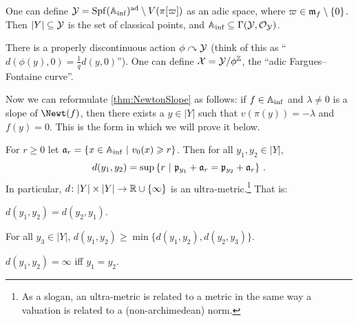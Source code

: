 \begin{rem}\label{rem:Y}
	\begin{numerate}
		\item One can define $\mathcal{Y}=\operatorname{Spf}(\mathbb{A}_{\mathrm{inf}})^\mathrm{ad}\setminus V(\pi[\varpi])$ as an adic space, where $\varpi\in\mathfrak{m}_f\setminus\{0\}$. Then $|Y|\subseteq \mathcal{Y}$ is the set of classical points, and $\mathbb{A}_{\mathrm{inf}}\subseteq \operatorname{\Gamma}(\mathcal{Y},\mathcal{O}_{\mathcal{Y}})$.
		\item There is a properly discontinuous action $\phi\curvearrowright\Yy$ (think of this as \enquote{$d(\phi(y),0)=\frac1qd(y,0)$}). One can define $\Xx=\Yy/\phi^\IZ$, the \enquote{adic Fargues--Fontaine curve}.
	\end{numerate}
\end{rem}
Now we can reformulate \cref{thm:NewtonSlope} as follows: if $f\in\mathbb{A}_{\mathrm{inf}}$ and $\lambda\neq 0$ is a slope of $\Newt(f)$, then there exists a $y\in |Y|$ such that $v(\pi(y))=-\lambda$ and $f(y)=0$. This is the form in which we will prove it below.
\begin{lem}\label{lem:d}
	For $r\geq 0$ let $\mathfrak{a}_r=\left\{x\in\mathbb{A}_{\mathrm{inf}}\ \middle|\  v_0(x)\geqslant r\right\}$. Then for all $y_1,y_2\in|Y|$,
	\begin{equation*}
		d(y_1,y_2)=\sup\left\{r\ \middle|\  \mathfrak{p}_{y_1}+\mathfrak{a}_r=\mathfrak{p}_{y_2}+\mathfrak{a}_r\right\}\,.
	\end{equation*}
	In particular, $d\colon |Y|\times|Y|\morphism \IR\cup\{\infty\}$ is an ultra-metric.\footnote{As a slogan, an ultra-metric is related to a metric in the same way a valuation is related to a (non-archimedean) norm.} That is:
	\begin{numerate}
		\item $d(y_1,y_2)=d(y_2,y_1)$.
		\item For all $y_3\in|Y|$, $d(y_1,y_2)\geq \min\{d(y_1,y_2),d(y_2,y_3)\}$.
		\item $d(y_1,y_2)=\infty$ iff $y_1=y_2$.
	\end{numerate}
\end{lem}
